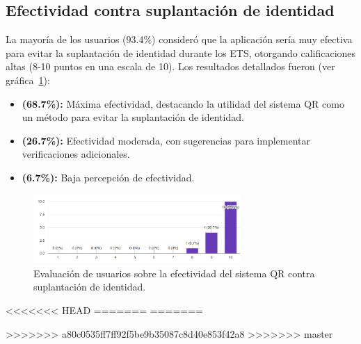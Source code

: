 \subsection{Efectividad contra suplantación de identidad}

La mayoría de los usuarios (93.4\%) consideró que la aplicación sería muy efectiva para evitar la suplantación de identidad durante los ETS, otorgando calificaciones altas (8-10 puntos en una escala de 10). Los resultados detallados fueron (ver gráfica~\ref{fig:efectividad}):

\begin{itemize}
	\item \textbf{(68.7\%):} Máxima efectividad, destacando la utilidad del sistema QR como un método para evitar la suplantación de identidad.
	\item \textbf{(26.7\%):} Efectividad moderada, con sugerencias para implementar verificaciones adicionales.
	\item \textbf{(6.7\%):} Baja percepción de efectividad.
\end{itemize}

\begin{figure}[H]
	\centering
	\includegraphics[width=0.7\textwidth]{images/efectividad.png}
	\caption{Evaluación de usuarios sobre la efectividad del sistema QR contra suplantación de identidad.}
	\label{fig:efectividad}
\end{figure}
<<<<<<< HEAD
=======
=======




>>>>>>> a80c0535ff7ff92f5be9b35087c8d40e853f42a8
>>>>>>> master
